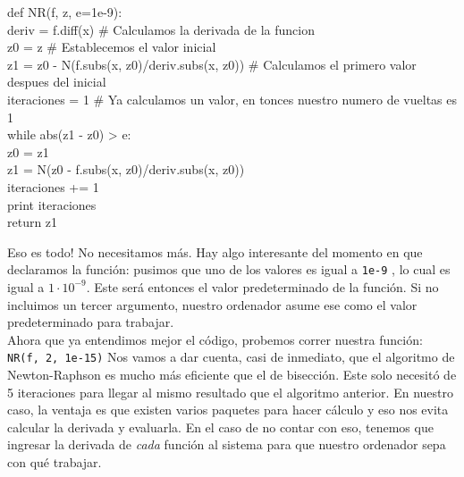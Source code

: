 \documentclass[10pt,letterpaper]{article}
\newcommand{\inlinecode}[1]{
\colorbox{light-gray}{\texttt{#1}}
}
\newenvironment{Code}
{
\begin{lrbox}{\selvestebox}%
\begin{minipage}{\dimexpr\columnwidth-2\fboxsep\relax}
\fontfamily{\ttdefault}\selectfont
}
{\end{minipage}\end{lrbox}%
\begin{center}
\colorbox{light-gray}{\usebox{\selvestebox}}
\end{center}
}
\begin{document}
\begin{footnotesize}
\begin{Code}
def NR(f, z, e=1e-9):\\
\hspace*{5mm} deriv = f.diff(x) \# Calculamos la derivada de la funcion\\
\hspace*{5mm} z0 = z \# Establecemos el valor inicial\\
\hspace*{5mm} z1 = z0 - N(f.subs(x, z0)/deriv.subs(x, z0)) \# Calculamos el primero valor despues del inicial\\
\hspace*{5mm} iteraciones = 1 \# Ya calculamos un valor, en tonces nuestro numero de vueltas es 1\\
\hspace*{5mm} while abs(z1 - z0) > e:\\
\hspace*{11mm} z0 = z1\\
\hspace*{11mm} z1 = N(z0 - f.subs(x, z0)/deriv.subs(x, z0))\\
\hspace*{11mm} iteraciones += 1\\
\hspace*{5mm} print iteraciones\\
\hspace*{5mm} return z1
\end{Code}
\end{footnotesize}

Eso es todo! No necesitamos m\'as. Hay algo interesante del momento en que declaramos la funci\'on: pusimos que uno de los valores es igual a \inlinecode{1e-9}, lo cual es igual a  $1 \cdot 10^{-9}$. Este ser\'a entonces el valor predeterminado de la funci\'on. Si no incluimos un tercer argumento, nuestro ordenador asume ese como el valor predeterminado para trabajar.\\

Ahora que ya entendimos mejor el c\'odigo, probemos correr nuestra funci\'on: \inlinecode{NR(f, 2, 1e-15)} Nos vamos a dar cuenta, casi de inmediato, que el algoritmo de Newton-Raphson es mucho m\'as eficiente que el de bisecci\'on. Este solo necesit\'o de 5 iteraciones para llegar al mismo resultado que el algoritmo anterior. En nuestro caso, la ventaja es que existen varios paquetes para hacer c\'alculo y eso nos evita calcular la derivada y evaluarla. En el caso de no contar con eso, tenemos que ingresar la derivada de \emph{cada} funci\'on al sistema para que nuestro ordenador sepa con qu\'e trabajar.
\end{document}

